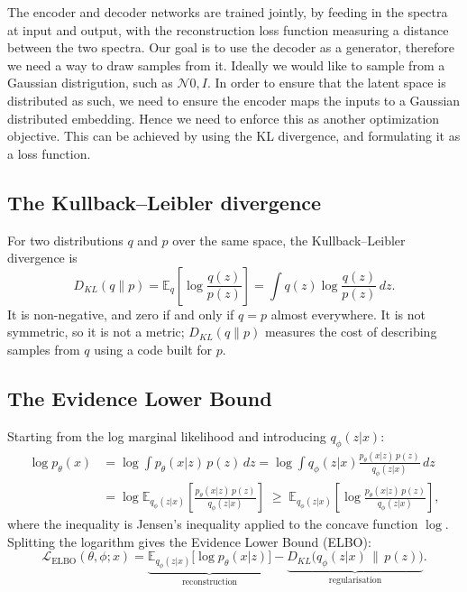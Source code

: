 The encoder and decoder networks are trained jointly, by feeding in the spectra at input and output, with the reconstruction loss function measuring a distance between the two spectra. Our goal is to use the decoder as a generator, therefore we need a way to draw samples from it. Ideally we would like to sample from a Gaussian distrigution, such as $\mathcal{N}{0,I}$. In order to ensure that the latent space is distributed as such, we need to ensure the encoder maps the inputs to a Gaussian distributed embedding. Hence we need to enforce this as another optimization objective. This can be achieved by using the KL divergence, and formulating it as a loss function.


\subsection*{The Kullback--Leibler divergence}

For two distributions $q$ and $p$ over the same space, the Kullback--Leibler divergence is
\begin{equation}
D_{KL}(q \| p) = \mathbb{E}_{q}\left[ \log \frac{q(z)}{p(z)} \right]
              = \int q(z) \log \frac{q(z)}{p(z)} \, dz .
\label{eq:kl_definition}
\end{equation}
It is non-negative, and zero if and only if $q = p$ almost everywhere. It is not symmetric, so
it is not a metric; $D_{KL}(q\|p)$ measures the cost of describing samples from $q$ using a
code built for $p$.

\subsection*{The Evidence Lower Bound}

Starting from the log marginal likelihood and introducing $q_\phi(z|x)$:
\begin{align}
\log p_\theta(x)
  &= \log \int p_\theta(x|z)\,p(z)\,dz
   = \log \int q_\phi(z|x) \frac{p_\theta(x|z)\,p(z)}{q_\phi(z|x)} \, dz \nonumber \\
  &= \log \mathbb{E}_{q_\phi(z|x)}\!\left[ \frac{p_\theta(x|z)\,p(z)}{q_\phi(z|x)} \right]
   \;\ge\; \mathbb{E}_{q_\phi(z|x)}\!\left[ \log \frac{p_\theta(x|z)\,p(z)}{q_\phi(z|x)} \right],
\label{eq:jensen}
\end{align}
where the inequality is Jensen's inequality applied to the concave function $\log$. Splitting
the logarithm gives the Evidence Lower Bound (ELBO):
\begin{equation}
\mathcal{L}_{\text{ELBO}}(\theta,\phi;x)
 = \underbrace{\mathbb{E}_{q_\phi(z|x)}\big[ \log p_\theta(x|z) \big]}_{\text{reconstruction}}
 - \underbrace{D_{KL}\big(q_\phi(z|x) \,\|\, p(z)\big)}_{\text{regularisation}} .
\label{eq:elbo}
\end{equation}

